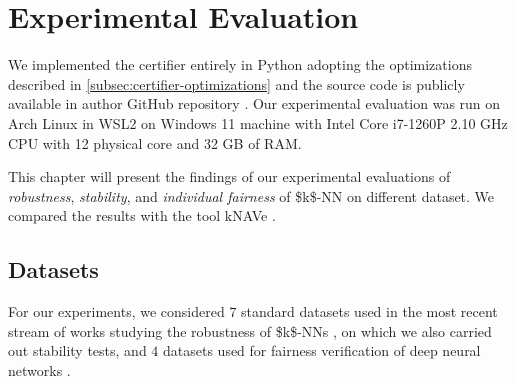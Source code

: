 
\chapter{Experimental Evaluation}
\label{chp:experimental-evaluation}


\noindent
We implemented the certifier entirely in Python adopting the optimizations described in \autoref{subsec:certifier-optimizations} and the source code is publicly available in author GitHub repository \cite{github}. Our experimental evaluation was run on Arch Linux in WSL2 on Windows 11 machine with Intel Core i7-1260P 2.10 GHz CPU with 12 physical core and 32 GB of RAM.

This chapter will present the findings of our experimental evaluations of \emph{robustness}, \emph{stability}, and \emph{individual fairness} of \acs{$k$-NN} on different dataset. We compared the results with the tool kNAVe \cite{Nicolo-knn}.

\section{Datasets}
\label{sec:datasets}

For our experiments, we considered $7$ standard datasets used in the most recent stream of works studying the robustness of \acsp{$k$-NN} \cite{WangJC18, Wang19, YangRWC20, SitawarinW19, SitawarinW20, SitawarinKSW21}, on which we also carried out stability tests, and $4$ datasets used for fairness verification of deep neural networks \cite{mehrabi2021survey}.

